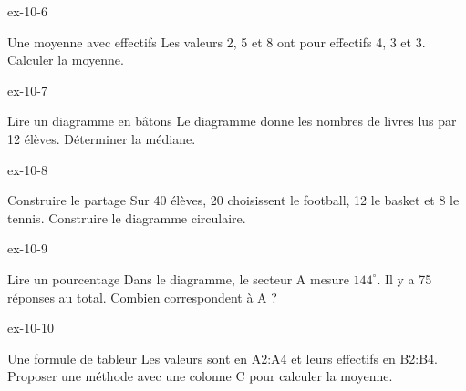 \begin{blocLivre}{ex-10-6}\begin{exercice}[2]{Une moyenne avec effectifs}
Les valeurs 2, 5 et 8 ont pour effectifs 4, 3 et 3. Calculer la moyenne.
\end{exercice}\end{blocLivre}
\begin{blocLivre}{ex-10-7}\begin{exercice}[2]{Lire un diagramme en bâtons}
Le diagramme donne les nombres de livres lus par 12 élèves. Déterminer la médiane.
\label{fig-ex-10-7}
\end{exercice}\end{blocLivre}
\begin{blocLivre}{ex-10-8}\begin{exercice}[2]{Construire le partage}
Sur 40 élèves, 20 choisissent le football, 12 le basket et 8 le tennis. Construire le diagramme circulaire.
\label{fig-ex-10-8}
\end{exercice}\end{blocLivre}
\begin{blocLivre}{ex-10-9}\begin{exercice}[2]{Lire un pourcentage}
Dans le diagramme, le secteur A mesure $144^\circ$. Il y a 75 réponses au total. Combien correspondent à A ?
\label{fig-ex-10-9}
\end{exercice}\end{blocLivre}
\begin{blocLivre}{ex-10-10}\begin{exercice}[2]{Une formule de tableur}
Les valeurs sont en A2:A4 et leurs effectifs en B2:B4. Proposer une méthode avec une colonne C pour calculer la moyenne.
\end{exercice}\end{blocLivre}

